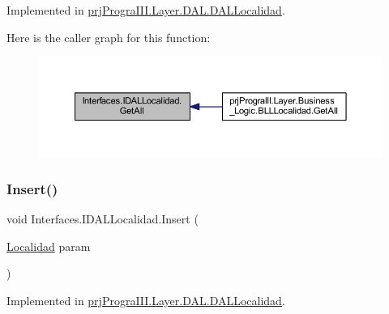 Implemented in \hyperlink{classprj_progra_i_i_i_1_1_layer_1_1_d_a_l_1_1_d_a_l_localidad_aeac57d97dd6728e382c3b52a8ab551d3}{prj\+Progra\+I\+I\+I.\+Layer.\+D\+A\+L.\+D\+A\+L\+Localidad}.

Here is the caller graph for this function\+:
\nopagebreak
\begin{figure}[H]
\begin{center}
\leavevmode
\includegraphics[width=350pt]{interface_interfaces_1_1_i_d_a_l_localidad_ab0985713e92391e4d781cf8bcf3eba45_icgraph}
\end{center}
\end{figure}
\hypertarget{interface_interfaces_1_1_i_d_a_l_localidad_a777e6b126a740cc546824c33af5ebd99}{}\label{interface_interfaces_1_1_i_d_a_l_localidad_a777e6b126a740cc546824c33af5ebd99} 
\subsubsection{\texorpdfstring{Insert()}{Insert()}}
{\footnotesize\ttfamily void Interfaces.\+I\+D\+A\+L\+Localidad.\+Insert (\begin{DoxyParamCaption}\item[{\hyperlink{classprj_progra_i_i_i_1_1_layer_1_1_entities_1_1_localidad}{Localidad}}]{param }\end{DoxyParamCaption})}



Implemented in \hyperlink{classprj_progra_i_i_i_1_1_layer_1_1_d_a_l_1_1_d_a_l_localidad_ac4a6e2c416a8372500396dcdb78a9f90}{prj\+Progra\+I\+I\+I.\+Layer.\+D\+A\+L.\+D\+A\+L\+Localidad}.

